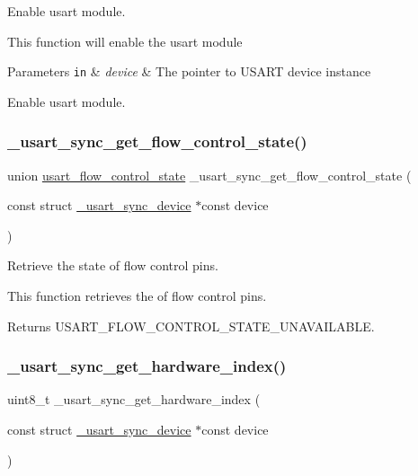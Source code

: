 Enable usart module. 

This function will enable the usart module


\begin{DoxyParams}[1]{Parameters}
\mbox{\tt in}  & {\em device} & The pointer to U\+S\+A\+RT device instance\\
\hline
\end{DoxyParams}
Enable usart module. \mbox{\label{group___h_p_l_ga5b6662f283d7a2791c7eed77635e9238}} 
\subsubsection{\texorpdfstring{\+\_\+usart\+\_\+sync\+\_\+get\+\_\+flow\+\_\+control\+\_\+state()}{\_usart\_sync\_get\_flow\_control\_state()}}
{\footnotesize\ttfamily union \hyperlink{unionusart__flow__control__state}{usart\+\_\+flow\+\_\+control\+\_\+state} \+\_\+usart\+\_\+sync\+\_\+get\+\_\+flow\+\_\+control\+\_\+state (\begin{DoxyParamCaption}\item[{const struct \hyperlink{struct__usart__sync__device}{\+\_\+usart\+\_\+sync\+\_\+device} $\ast$const}]{device }\end{DoxyParamCaption})}



Retrieve the state of flow control pins. 

This function retrieves the of flow control pins.

\begin{DoxyReturn}{Returns}
U\+S\+A\+R\+T\+\_\+\+F\+L\+O\+W\+\_\+\+C\+O\+N\+T\+R\+O\+L\+\_\+\+S\+T\+A\+T\+E\+\_\+\+U\+N\+A\+V\+A\+I\+L\+A\+B\+LE. 
\end{DoxyReturn}
\mbox{\label{group___h_p_l_ga8fd6539ded0699161df00f23ba6580aa}} 
\subsubsection{\texorpdfstring{\+\_\+usart\+\_\+sync\+\_\+get\+\_\+hardware\+\_\+index()}{\_usart\_sync\_get\_hardware\_index()}}
{\footnotesize\ttfamily uint8\+\_\+t \+\_\+usart\+\_\+sync\+\_\+get\+\_\+hardware\+\_\+index (\begin{DoxyParamCaption}\item[{const struct \hyperlink{struct__usart__sync__device}{\+\_\+usart\+\_\+sync\+\_\+device} $\ast$const}]{device }\end{DoxyParamCaption})}



